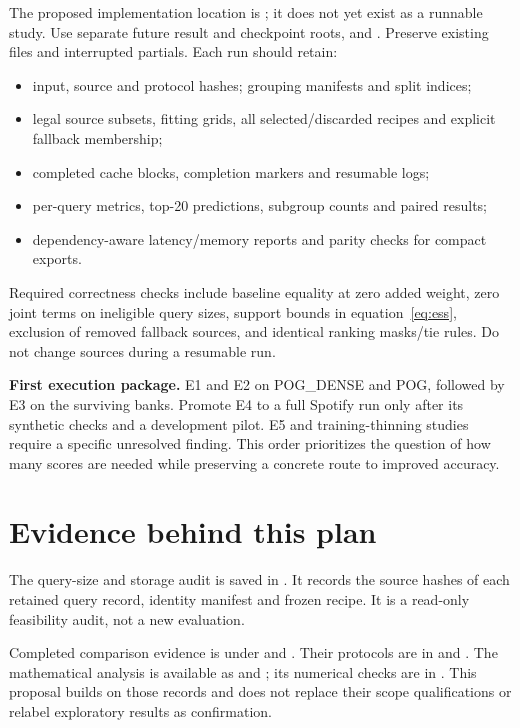 \documentclass[11pt,a4paper]{article}
\begin{document}
The proposed implementation location is ;
it does not yet exist as a runnable study. Use separate future result and
checkpoint roots,  and
. Preserve existing files and interrupted
partials. Each run should retain:
\begin{itemize}
\item input, source and protocol hashes; grouping manifests and split indices;
\item legal source subsets, fitting grids, all selected/discarded recipes and
explicit fallback membership;
\item completed cache blocks, completion markers and resumable logs;
\item per-query metrics, top-20 predictions, subgroup counts and paired results;
\item dependency-aware latency/memory reports and parity checks for compact exports.
\end{itemize}
Required correctness checks include baseline equality at zero added weight,
zero joint terms on ineligible query sizes, support bounds in
equation~\eqref{eq:ess}, exclusion of removed fallback sources, and identical
ranking masks/tie rules. Do not change sources during a resumable run.

\textbf{First execution package.} E1 and E2 on POG\_DENSE and POG, followed
by E3 on the surviving banks. Promote E4 to a full Spotify run only after
its synthetic checks and a development pilot. E5 and training-thinning
studies require a specific unresolved finding. This order prioritizes the
question of how many scores are needed while preserving a concrete route
to improved accuracy.

\section*{Evidence behind this plan}

The query-size and storage audit is saved in
.
It records the source hashes of each retained query record, identity manifest
and frozen recipe. It is a read-only feasibility audit, not a new evaluation.

Completed comparison evidence is under
 and
. Their protocols are in
 and
. The mathematical analysis
is available as  and
; its numerical checks are in
.
This proposal builds on those records and does not replace their scope
qualifications or relabel exploratory results as confirmation.
\end{document}
